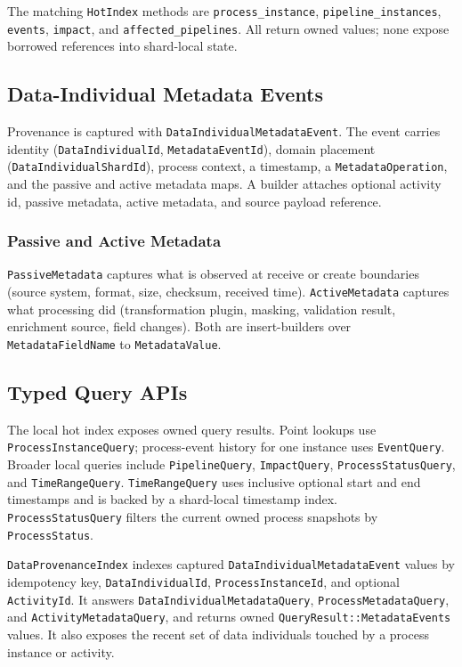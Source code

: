 The matching \texttt{HotIndex} methods are \texttt{process\_instance},
\texttt{pipeline\_instances}, \texttt{events}, \texttt{impact}, and
\texttt{affected\_pipelines}. All return owned values; none expose borrowed
references into shard-local state.

\subsection{Data-Individual Metadata Events}

Provenance is captured with \texttt{DataIndividualMetadataEvent}. The event
carries identity (\texttt{DataIndividualId}, \texttt{MetadataEventId}), domain
placement (\texttt{DataIndividualShardId}), process context, a timestamp, a
\texttt{MetadataOperation}, and the passive and active metadata maps. A builder
attaches optional activity id, passive metadata, active metadata, and source
payload reference.

\subsubsection{Passive and Active Metadata}

\texttt{PassiveMetadata} captures what is observed at receive or create
boundaries (source system, format, size, checksum, received time).
\texttt{ActiveMetadata} captures what processing did (transformation plugin,
masking, validation result, enrichment source, field changes). Both are
insert-builders over \texttt{MetadataFieldName} to \texttt{MetadataValue}.

\subsection{Typed Query APIs}

The local hot index exposes owned query results. Point lookups use
\texttt{ProcessInstanceQuery}; process-event history for one instance uses
\texttt{EventQuery}. Broader local queries include \texttt{PipelineQuery},
\texttt{ImpactQuery}, \texttt{ProcessStatusQuery}, and \texttt{TimeRangeQuery}.
\texttt{TimeRangeQuery} uses inclusive optional start and end timestamps and is
backed by a shard-local timestamp index. \texttt{ProcessStatusQuery} filters the
current owned process snapshots by \texttt{ProcessStatus}.

\texttt{DataProvenanceIndex} indexes captured
\texttt{DataIndividualMetadataEvent} values by idempotency key,
\texttt{DataIndividualId}, \texttt{ProcessInstanceId}, and optional
\texttt{ActivityId}. It answers \texttt{DataIndividualMetadataQuery},
\texttt{ProcessMetadataQuery}, and \texttt{ActivityMetadataQuery}, and returns
owned \texttt{QueryResult::MetadataEvents} values. It also exposes the recent
set of data individuals touched by a process instance or activity.

